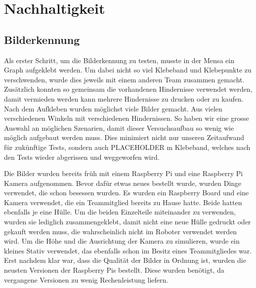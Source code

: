 \section{Nachhaltigkeit}







\subsection{Bilderkennung}

Als erster Schritt, um die Bilderkennung zu testen, musste in der Mensa ein Graph aufgeklebt werden.
Um dabei nicht so viel Klebeband und Klebepunkte zu verschwenden, wurde dies jeweils mit einem anderen Team zusammen gemacht. Zusätzlich konnten so gemeinsam die vorhandenen Hindernisse verwendet werden, damit vermieden werden kann mehrere Hindernisse zu drucken oder zu kaufen.
Nach dem Aufkleben wurden möglichst viele Bilder gemacht. Aus vielen verschiedenen Winkeln mit verschiedenen Hindernissen. So haben wir eine grosse Auswahl an möglichen Szenarien, damit dieser Versuchsaufbau so wenig wie möglich aufgebaut werden muss. Dies minimiert nicht nur unseren Zeitaufwand für zukünftige Tests, sondern auch PLACEHOLDER m Klebeband, welches nach den Tests wieder abgerissen und weggeworfen wird.

Die Bilder wurden bereits früh mit einem Raspberry Pi und eine Raspberry Pi Kamera aufgenommen. Bevor dafür etwas neues bestellt wurde, wurden Dinge verwendet, die schon besessen wurden. Es wurden ein Raspberry Board und eine Kamera verwendet, die ein Teammitglied bereits zu Hause hatte. Beide hatten ebenfalls je eine Hülle.
Um die beiden Einzelteile miteinander zu verwenden, wurden sie lediglich zusammengeklebt, damit nicht eine neue Hülle gedruckt oder gekauft werden muss, die wahrscheinlich nicht im Roboter verwendet werden wird.
Um die Höhe und die Ausrichtung der Kamera zu simulieren, wurde ein kleines Stativ verwendet, das ebenfalls schon im Besitz eines Teammitgliedes war.
Erst nachdem klar war, dass die Qualität der Bilder in Ordnung ist, wurden die neusten Versionen der Raspberry Pis bestellt. Diese wurden benötigt, da vergangene Versionen zu wenig Rechenleistung liefern.

